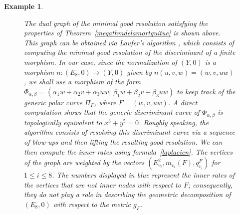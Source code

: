 \documentclass[reqno,dvipsnames,12pt]{amsart}
\newtheorem{exam}[thm]{Example}
\begin{document}
\begin{exam}
\begin{itemize}
\begin{figure}[htbp]
\begin{tikzpicture}[node distance=5cm, very thick]
    \end{tikzpicture}
    \caption{The dual graph of the minimal good resolution satisfying the properties of Theorem~\ref{megathmdelamortquitue} is shown above. This graph can be obtained via Laufer's algorithm \cite[Chapter 2]{laufer1972}, which consists of computing the minimal good resolution of the discriminant of a finite morphism. In our case, since the normalization of $(Y,0)$ is a morphism $n: (E_8,0) \longrightarrow (Y,0)$ given by $n(u,v,w)=(w,v,uw)$, we shall use a morphism of the form $\Phi_{\alpha,\beta}=(\alpha_1w+\alpha_2v+\alpha_3uw, \,\beta_1w+\beta_2v+\beta_3uw)$ to keep track of the generic polar curve $\Pi_F$, where $F=(w,v,uw)$. A direct computation shows that the generic discriminant curve of $\Phi_{\alpha,\beta}$ is topologically equivalent to $x^3+y^5=0$. Roughly speaking, the algorithm consists of resolving this discriminant curve via a sequence of blow-ups and then lifting the resulting good resolution. We can then compute the inner rates using formula~\ref{laplacien}. The vertices of the graph are weighted by the vectors $(E_{v_i}^2, m_{v_i}(F), q_{v_i}^{F})$ for $1 \leq i \leq 8$. The numbers displayed in blue represent the inner rates of the vertices that are not inner nodes with respect to $F$; consequently, they do not play a role in describing the geometric decomposition of $(E_8,0)$ with respect to the metric $g_F$.}
\end{figure}

    \end{itemize}
\end{exam}






\newpage 




\end{document}
